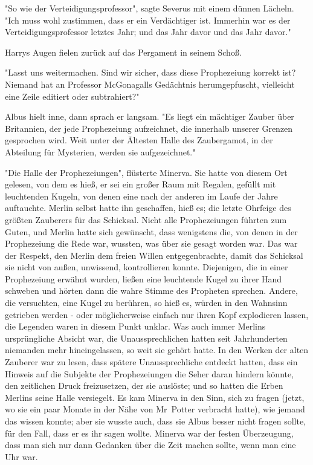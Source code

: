{"So wie der Verteidigungsprofessor", sagte Severus mit einem dünnen Lächeln. "Ich muss wohl zustimmen, dass er ein Verdächtiger ist. Immerhin war es der Verteidigungsprofessor letztes Jahr; und das Jahr davor und das Jahr davor."

Harrys Augen fielen zurück auf das Pergament in seinem Schoß.

"Lasst uns weitermachen. Sind wir sicher, dass diese Prophezeiung korrekt ist? Niemand hat an Professor McGonagalls Gedächtnis herumgepfuscht, vielleicht eine Zeile editiert oder subtrahiert?"

Albus hielt inne, dann sprach er langsam. "Es liegt ein mächtiger Zauber über Britannien, der jede Prophezeiung aufzeichnet, die innerhalb unserer Grenzen gesprochen wird. Weit unter der Ältesten Halle des Zaubergamot, in der Abteilung für Mysterien, werden sie aufgezeichnet."

"Die Halle der Prophezeiungen", flüsterte Minerva. Sie hatte von diesem Ort gelesen, von dem es hieß, er sei ein großer Raum mit Regalen, gefüllt mit leuchtenden Kugeln, von denen eine nach der anderen im Laufe der Jahre auftauchte. Merlin selbst hatte ihn geschaffen, hieß es; die letzte Ohrfeige des größten Zauberers für das Schicksal. Nicht alle Prophezeiungen führten zum Guten, und Merlin hatte sich gewünscht, dass wenigstens die, von denen in der Prophezeiung die Rede war, wussten, was über sie gesagt worden war. Das war der Respekt, den Merlin dem freien Willen entgegenbrachte, damit das Schicksal sie nicht von außen, unwissend, kontrollieren konnte. Diejenigen, die in einer Prophezeiung erwähnt wurden, ließen eine leuchtende Kugel zu ihrer Hand schweben und hörten dann die wahre Stimme des Propheten sprechen. Andere, die versuchten, eine Kugel zu berühren, so hieß es, würden in den Wahnsinn getrieben werden - oder möglicherweise einfach nur ihren Kopf explodieren lassen, die Legenden waren in diesem Punkt unklar. Was auch immer Merlins ursprüngliche Absicht war, die Unaussprechlichen hatten seit Jahrhunderten niemanden mehr hineingelassen, so weit sie gehört hatte. In den Werken der alten Zauberer war zu lesen, dass spätere Unaussprechliche entdeckt hatten, dass ein Hinweis auf die Subjekte der Prophezeiungen die Seher daran hindern könnte, den zeitlichen Druck freizusetzen, der sie auslöste; und so hatten die Erben Merlins seine Halle versiegelt. Es kam Minerva in den Sinn, sich zu fragen (jetzt, wo sie ein paar Monate in der Nähe von Mr~Potter verbracht hatte), wie jemand das wissen konnte; aber sie wusste auch, dass sie Albus besser nicht fragen sollte, für den Fall, dass er es ihr sagen wollte. Minerva war der festen Überzeugung, dass man sich nur dann Gedanken über die Zeit machen sollte, wenn man eine Uhr war.

}
